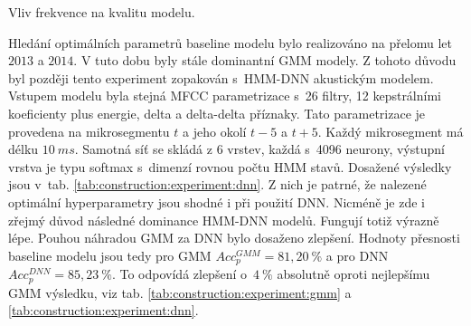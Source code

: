 
\begin{table}[htpb]
  \centering
  \def\arraystretch{1.5}
  \caption{Vliv frekvence na kvalitu modelu.}
  \label{tab:construction:experiment:gmm}
\end{table}

Hledání optimálních parametrů baseline modelu bylo realizováno na přelomu let $2013$ a $2014$.
V tuto dobu byly stále dominantní GMM modely.
Z tohoto důvodu byl později tento experiment zopakován s~HMM-DNN akustickým modelem.
Vstupem modelu byla stejná MFCC parametrizace s~26 filtry, 12 kepstrálními koeficienty plus energie, delta a delta-delta příznaky.
Tato parametrizace je provedena na mikrosegmentu $t$ a jeho okolí $t-5$ a $t+5$.
Každý mikrosegment má délku $10\ ms$.
Samotná síť se skládá z 6 vrstev, každá s~4096 neurony, výstupní vrstva je typu softmax s~dimenzí rovnou počtu HMM stavů.
Dosažené výsledky jsou v~tab. \ref{tab:construction:experiment:dnn}.
Z nich je patrné, že nalezené optimální hyperparametry jsou shodné i při použití DNN.
Nicméně je zde i zřejmý důvod následné dominance HMM-DNN modelů.
Fungují totiž výrazně lépe.
Pouhou náhradou GMM za DNN bylo dosaženo zlepšení.
Hodnoty přesnosti baseline modelu jsou tedy pro GMM $Acc_{p}^{GMM} = 81,20~\%$ a pro DNN $Acc_{p}^{DNN} = 85,23~\%$. To odpovídá zlepšení o~$4~\%$ absolutně oproti nejlepšímu GMM výsledku, viz tab. \ref{tab:construction:experiment:gmm} a \ref{tab:construction:experiment:dnn}.



